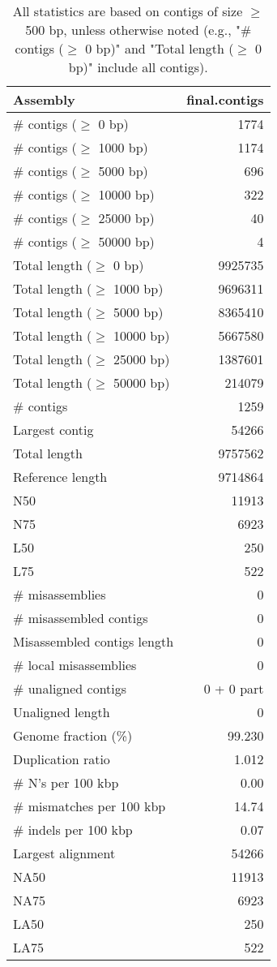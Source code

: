 \documentclass[12pt,a4paper]{article}
\begin{document}
\begin{table}[ht]
\begin{center}
\caption{All statistics are based on contigs of size $\geq$ 500 bp, unless otherwise noted (e.g., "\# contigs ($\geq$ 0 bp)" and "Total length ($\geq$ 0 bp)" include all contigs).}
\begin{tabular}{|l*{1}{|r}|}
\hline
Assembly & final.contigs \\ \hline
\# contigs ($\geq$ 0 bp) & 1774 \\ \hline
\# contigs ($\geq$ 1000 bp) & 1174 \\ \hline
\# contigs ($\geq$ 5000 bp) & 696 \\ \hline
\# contigs ($\geq$ 10000 bp) & 322 \\ \hline
\# contigs ($\geq$ 25000 bp) & 40 \\ \hline
\# contigs ($\geq$ 50000 bp) & 4 \\ \hline
Total length ($\geq$ 0 bp) & 9925735 \\ \hline
Total length ($\geq$ 1000 bp) & 9696311 \\ \hline
Total length ($\geq$ 5000 bp) & 8365410 \\ \hline
Total length ($\geq$ 10000 bp) & 5667580 \\ \hline
Total length ($\geq$ 25000 bp) & 1387601 \\ \hline
Total length ($\geq$ 50000 bp) & 214079 \\ \hline
\# contigs & 1259 \\ \hline
Largest contig & 54266 \\ \hline
Total length & 9757562 \\ \hline
Reference length & 9714864 \\ \hline
N50 & 11913 \\ \hline
N75 & 6923 \\ \hline
L50 & 250 \\ \hline
L75 & 522 \\ \hline
\# misassemblies & 0 \\ \hline
\# misassembled contigs & 0 \\ \hline
Misassembled contigs length & 0 \\ \hline
\# local misassemblies & 0 \\ \hline
\# unaligned contigs & 0 + 0 part \\ \hline
Unaligned length & 0 \\ \hline
Genome fraction (\%) & 99.230 \\ \hline
Duplication ratio & 1.012 \\ \hline
\# N's per 100 kbp & 0.00 \\ \hline
\# mismatches per 100 kbp & 14.74 \\ \hline
\# indels per 100 kbp & 0.07 \\ \hline
Largest alignment & 54266 \\ \hline
NA50 & 11913 \\ \hline
NA75 & 6923 \\ \hline
LA50 & 250 \\ \hline
LA75 & 522 \\ \hline
\end{tabular}
\end{center}
\end{table}
\end{document}
